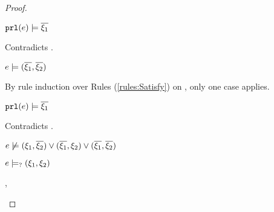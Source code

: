 \begin{proof}
\begin{byCases}
\begin{byCases}
\begin{byCases}
\begin{byCases}
\begin{byCases}
                    \begin{byCases}
                    \item[\text{(\ref{rule:CSNotValPair})}]
                        \begin{pfsteps*}
                        \item $\mathtt{prl}(e) \models \overline{\xi_1}$ 
                        \end{pfsteps*}
                        Contradicts .
                    \end{byCases}
                \item[\text{(\ref{rule:CSOr2})}]
                    \begin{pfsteps*}
                    \item $e \models (\overline{\xi_1} , \overline{\xi_2})$  
                    \end{pfsteps*}
                    By rule induction over Rules (\ref{rules:Satisfy}) on , only one case applies.
                    \begin{byCases}
                    \item[\text{(\ref{rule:CSNotValPair})}]
                        \begin{pfsteps*}
                        \item $\mathtt{prl}(e) \models \overline{\xi_1}$ 
                        \end{pfsteps*}
                        Contradicts .
                    \end{byCases}
                \end{byCases}
            \end{byCases}
            \begin{pfsteps*}
            \item $e \not\models (\xi_1 , \overline{\xi_2}) \vee (\overline{\xi_1} , \xi_2) \vee (\overline{\xi_1} , \overline{\xi_2})$  
            \item $e \models_{?} (\xi_1 , \xi_2)$ 
            \end{pfsteps*}
        \item[\cmaysatisfy{\hprl{e}}{\xi_1},\cmaysatisfy{\hprr{e}}{\xi_2}]

\end{byCases}
\end{byCases}
\end{byCases}
\end{proof}
